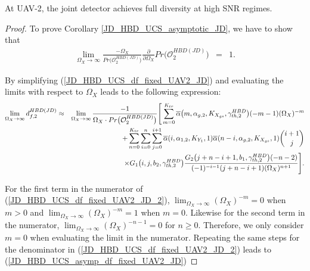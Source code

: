 \begin{corollary} \label{JD_HBD_UCS_asymptotic_JD}
At UAV-2, the joint detector achieves full diversity at high SNR regimes.
\begin{proof}
To prove Corollary \ref{JD_HBD_UCS_asymptotic_JD}, we have to show that 
\begin{eqnarray} \label{JD_HBD_UCS_asymp_df_fixed_UAV2_JD}
\lim_{\Omega_X\to\infty} \frac{-\Omega_X}{Pr\big(\mathcal{O}_{2}^{HBD(JD)}\big)} \frac{\partial}{\partial\Omega_X}Pr\big(\mathcal{O}_{2}^{HBD(JD)}\big) & = & 1.
\end{eqnarray}

By simplifying (\ref{JD_HBD_UCS_df_fixed_UAV2_JD}) and evaluating the limits with respect to $\Omega_X$ leads to the following expression:
\begin{eqnarray} \label{JD_HBD_UCS_df_fixed_UAV2_JD_2}
\lim_{\Omega_X\to\infty} d_{f,2}^{HBD(JD)} & \approx & \lim_{\Omega_X\to\infty} \frac{-1}{\Omega_X \cdot Pr\big(\mathcal{O}_{2}^{HBD(JD)}\big)} \Bigg[ \sum_{m=0}^{K_{tr}} \overline{\alpha}\big(m,\alpha_{g,2},K_{X_{gs}},\gamma_{th,2}^{HBD}\big) (-m-1) (\Omega_{X})^{-m} \nonumber\\
& & \hspace{-0cm} + \sum_{n=0}^{K_{tr}}\sum_{i=0}^{n}\sum_{j=0}^{i+1} \overline{\alpha}(i,\alpha_{1,2},K_{Y_1},1) \overline{\alpha}(n-i,\alpha_{g,2},K_{X_{gs}},1) \binom{i+1}{j} \nonumber\\
& & \hspace{1cm} \times G_1\big(i,j,b_2,\gamma_{th,2}^{HBD}\big) \frac{G_2\big(j+n-i+1,b_1,\gamma_{th,2}^{HBD}\big) (-n-2)}{(-1)^{-i-1}(j+n-i+1)(\Omega_X)^{n+1}} \Bigg].
\end{eqnarray}

For the first term in the numerator of (\ref{JD_HBD_UCS_df_fixed_UAV2_JD_2}), $\lim_{\Omega_X\to\infty} \left(\Omega_X\right)^{-m} = 0$ when $m>0$ and $\lim_{\Omega_X\to\infty} \left(\Omega_X\right)^{-m} = 1$ when $m=0$. Likewise for the second term in the numerator, $\lim_{\Omega_X\to\infty} \left(\Omega_X\right)^{-n-1} = 0$ for $n\geq0$. Therefore, we only consider $m=0$ when evaluating the limit in the numerator. Repeating the same steps for the denominator in (\ref{JD_HBD_UCS_df_fixed_UAV2_JD_2}) leads to (\ref{JD_HBD_UCS_asymp_df_fixed_UAV2_JD})
\end{proof}
\end{corollary}


